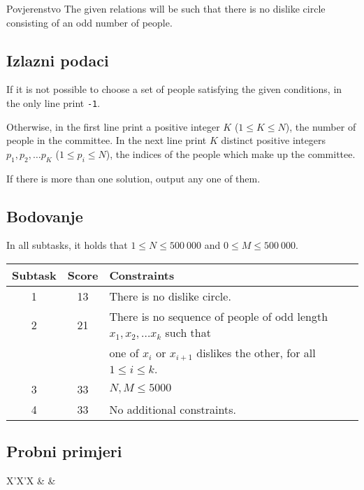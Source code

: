 \begin{statement}[
  problempoints=100,
  timelimit=3 sekunde,
  memorylimit=512 MiB,
]{Povjerenstvo}
The given relations will be such that there is no dislike circle consisting 
of an odd number of people.

\subsection*{Izlazni podaci}

If it is not possible to choose a set of people satisfying the given conditions, 
in the only line print \texttt{-1}.

Otherwise, in the first line print a positive integer $K$ ($1 \leq K \leq N$), 
the number of people in the committee. In the next line print $K$ distinct 
positive integers $p_1, p_2, \dots p_K$ ($1 \leq p_i \leq N$), the indices of 
the people which make up the committee.

If there is more than one solution, output any one of them.

\subsection*{Bodovanje}

In all subtasks, it holds that $1 \leq N \leq 500~000$ and $0 \leq M \leq 500~000$.

{\renewcommand{\arraystretch}{1.4}
  \setlength{\tabcolsep}{6pt}
  \begin{tabular}{ccl}
   Subtask & Score & Constraints \\ \midrule
    1 & 13 & There is no dislike circle. \\
    2 & 21 & There is no sequence of people of odd length $x_1, x_2, \dots x_k$ such that \\
      &    & one of $x_i$ or $x_{i+1}$ dislikes the other, for all $1 \leq i \leq k$. \\
    3 & 33 & $N, M \leq 5000$ \\
    4 & 33 & No additional constraints.
\end{tabular}}

\subsection*{Probni primjeri}
\begin{tabularx}{\textwidth}{X'X'X}
 &
 &
\end{tabularx}


\end{statement}
